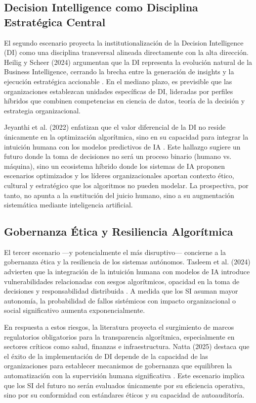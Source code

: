 \documentclass[conference]{IEEEtran}
\begin{document}
\subsection{Decision Intelligence como Disciplina Estratégica Central}
El segundo escenario proyecta la institutionalización de la Decision Intelligence (DI) como una disciplina transversal alineada directamente con la alta dirección. Heilig y Scheer (2024) argumentan que la DI representa la evolución natural de la Business Intelligence, cerrando la brecha entre la generación de insights y la ejecución estratégica accionable \cite{heilig2024}. En el mediano plazo, es previsible que las organizaciones establezcan unidades específicas de DI, lideradas por perfiles híbridos que combinen competencias en ciencia de datos, teoría de la decisión y estrategia organizacional.

Jeyanthi et al. (2022) enfatizan que el valor diferencial de la DI no reside únicamente en la optimización algorítmica, sino en su capacidad para integrar la intuición humana con los modelos predictivos de IA \cite{jeyanthi2022}. Este hallazgo sugiere un futuro donde la toma de decisiones no será un proceso binario (humano vs. máquina), sino un ecosistema híbrido donde los sistemas de IA proponen escenarios optimizados y los líderes organizacionales aportan contexto ético, cultural y estratégico que los algoritmos no pueden modelar. La prospectiva, por tanto, no apunta a la sustitución del juicio humano, sino a su augmentación sistemática mediante inteligencia artificial.

\subsection{Gobernanza Ética y Resiliencia Algorítmica}
El tercer escenario —y potencialmente el más disruptivo— concierne a la gobernanza ética y la resiliencia de los sistemas autónomos. Tasleem et al. (2024) advierten que la integración de la intuición humana con modelos de IA introduce vulnerabilidades relacionadas con sesgos algorítmicos, opacidad en la toma de decisiones y responsabilidad distribuida \cite{tasleem2024}. A medida que los SI asuman mayor autonomía, la probabilidad de fallos sistémicos con impacto organizacional o social significativo aumenta exponencialmente.

En respuesta a estos riesgos, la literatura proyecta el surgimiento de marcos regulatorios obligatorios para la transparencia algorítmica, especialmente en sectores críticos como salud, finanzas e infraestructura. Natta (2025) destaca que el éxito de la implementación de DI depende de la capacidad de las organizaciones para establecer mecanismos de gobernanza que equilibren la automatización con la supervisión humana significativa \cite{natta2025}. Este escenario implica que los SI del futuro no serán evaluados únicamente por su eficiencia operativa, sino por su conformidad con estándares éticos y su capacidad de autoauditoría.
\end{document}
